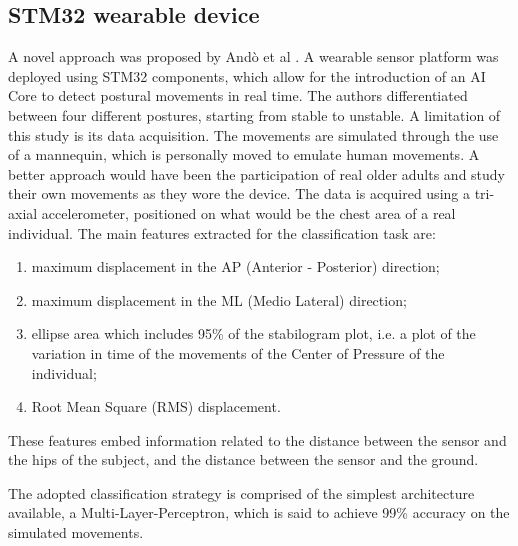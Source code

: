 \subsection{STM32 wearable device}
A novel approach was proposed by Andò et al \cite{PosturalClasses}. A wearable sensor platform was deployed using STM32 components, which allow for the introduction of an AI Core to detect postural movements in real time. The authors differentiated between four different postures, starting from stable to unstable. 
A limitation of this study is its data acquisition. The movements are simulated through the use of a mannequin, which is personally moved to emulate human movements. A better approach would have been the participation of real older adults and study their own movements as they wore the device. The data is acquired using a tri-axial accelerometer, positioned on what would be the chest area of a real individual. 
The main features extracted for the classification task are:
\begin{enumerate}
    \itemsep0cm 
    \item maximum displacement in the AP (Anterior - Posterior) direction;
    \item maximum displacement in the ML (Medio Lateral) direction;
    \item ellipse area which includes 95\% of the stabilogram plot, i.e. a plot of the variation in time of the movements of the Center of Pressure of the individual;  
    \item Root Mean Square (RMS) displacement.
\end{enumerate}
These features embed information related to the distance between the sensor and the hips of the subject, and the distance between the sensor and the ground. 

The adopted classification strategy is comprised of the simplest architecture available, a Multi-Layer-Perceptron, which is said to achieve 99\% accuracy on the simulated movements.

